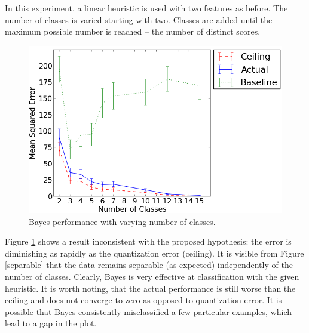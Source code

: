 \documentclass[12pt,a4paper,notitlepage,twoside]{scrbook}
\begin{document}
In this experiment, a linear heuristic is used with two features as before. The number of
classes is varied starting with two. Classes are added until the maximum possible
number is reached -- the number of distinct scores. 

\begin{figure}[h!]
	\centering
  \includegraphics[width=0.8\linewidth]{figs/quants.png}
  \caption{Bayes performance with varying number of classes.\label{quants}}
\end{figure}
Figure \ref{quants} shows a result inconsistent with the proposed hypothesis: the error is
diminishing as rapidly as the quantization error (ceiling). It is visible from Figure
\ref{separable} that the data remains separable (as expected) independently of the number
of classes. Clearly, Bayes is very effective at classification with the given heuristic.
It is worth noting, that the actual performance is still worse than the ceiling and does
not converge to zero as opposed to quantization error. It is possible that Bayes
consistently misclassified a few particular examples, which lead to a gap in the plot.
\end{document}
